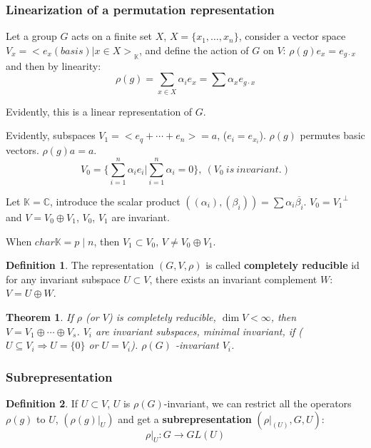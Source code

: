 \documentclass[12pt, a4paper]{article}
\newtheorem{theorem}{Theorem}[section]
\theoremstyle{definition}
\newtheorem{definition}{Definition}[section]
\begin{document}
\subsubsection{Linearization of a permutation representation}
Let a group $G$ acts on a finite set $X$, $X = \{x_1,\ldots,x_n\}$, consider a vector space 
$V_x ={<e_x(basis)|x\in X >}_{\mathbb{K}} $, and define the action of $G$ on $V$: 
$\rho(g)e_x = e_{g\cdot x}$
and then by linearity:
\[\rho(g) = \sum_{x\in X}\alpha_i e_x = \sum\alpha_x e_{g\cdot x}\]
\par
Evidently, this is a linear representation of $G$.
\par
Evidently, subspaces $V_1 = <e_q+ \cdots + e_n>=a $, ($e_i = e_{x_i} $). $\rho(g)$ permutes
basic vectors. $\rho(g)a =a $.
\[V_0 = \{\sum_{i=1}^n \alpha_i e_i | \sum_{i=1}^n \alpha_i = 0 \},\ (V_0\ is\ invariant.)\]
\par
Let $\mathbb{K} = \mathbb{C} $, introduce the scalar product $((\alpha_i),(\beta_i)) = \sum
\alpha_i \overline{\beta_i}$. $V_0 = {V_1}^\bot $ and $V = V_0 \oplus V_1 $, $V_0$, $V_1$ are
invariant.
\par
When $char \mathbb{K} = p\mid n$, then $V_1 \subset V_0 $, $V\neq V_0 \oplus V_1 $.
\begin{definition}
    The representation $(G, V, \rho) $ is called \textbf{completely reducible} id for any 
    invariant subspace $U \subset V $, there exists an invariant complement $W$: $V = U\oplus
    W $.
\end{definition}
\begin{theorem}
    If $\rho$ (or $V$) is completely reducible, $\dim V <\infty $, then $V = V_1\oplus \cdots
    \oplus V_s$. $V_i$ are invariant subspaces, minimal invariant, if ($U \subseteq V_i 
    \Rightarrow U = \{0\}$ or $U = V_i $). $\rho(G) $ -invariant $V_i$.
\end{theorem}
\subsubsection{Subrepresentation}
\begin{definition}
    If $U\subset V $, $U$ is $\rho(G)$-invariant, we can restrict all the operators $\rho(g)$
    to $U$, $(\rho(g)|_U) $ and get a \textbf{subrepresentation} $(\rho|_{(U)},G,U) $:
    \[\rho|_{U}:G\rightarrow GL(U) \]
\end{definition}
\end{document}
